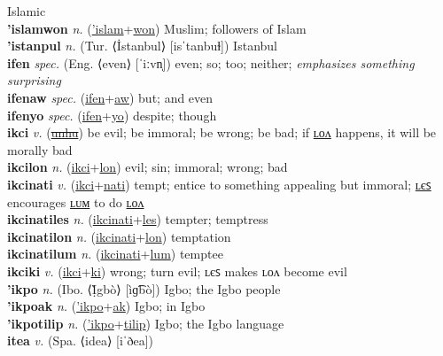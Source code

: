Islamic \label{'islamak} \\
\textbf{'islamwon} \textit{n.} (\hyperref['islam]{'islam}+\hyperref[won]{won})
Muslim; followers of Islam \label{'islamwon} \\
\textbf{'istanpul} \textit{n.} (Tur. ⟨İstanbul⟩ [isˈtanbuɫ])
Istanbul \label{'istanpul} \\
\textbf{ifen} \textit{spec.} (Eng. ⟨even⟩ [ˈiːvn̩])
even; so; too; neither; \textit{emphasizes something surprising} \label{ifen} \\
\textbf{ifenaw} \textit{spec.} (\hyperref[ifen]{ifen}+\hyperref[aw]{aw})
but; and even \label{ifenaw} \\
\textbf{ifenyo} \textit{spec.} (\hyperref[ifen]{ifen}+\hyperref[yo]{yo})
despite; though \label{ifenyo} \\
\textbf{ikci} \textit{v.} (\hyperref[unhu]{\sout{unhu}})
be evil; be immoral; be wrong; be bad; if \hyperref[ikcilon]{ʟᴏᴧ} happens, it will be morally bad \label{ikci} \\
\textbf{ikcilon} \textit{n.} (\hyperref[ikci]{ikci}+\hyperref[lon]{lon})
evil; sin; immoral; wrong; bad \label{ikcilon} \\
\textbf{ikcinati} \textit{v.} (\hyperref[ikci]{ikci}+\hyperref[nati]{nati})
tempt; entice to something appealing but immoral; \hyperref[ikcinatiles]{ʟєꜱ} encourages \hyperref[ikcinatilum]{ʟᴜᴍ} to do \hyperref[ikcinatilon]{ʟᴏᴧ} \label{ikcinati} \\
\textbf{ikcinatiles} \textit{n.} (\hyperref[ikcinati]{ikcinati}+\hyperref[les]{les})
tempter; temptress \label{ikcinatiles} \\
\textbf{ikcinatilon} \textit{n.} (\hyperref[ikcinati]{ikcinati}+\hyperref[lon]{lon})
temptation \label{ikcinatilon} \\
\textbf{ikcinatilum} \textit{n.} (\hyperref[ikcinati]{ikcinati}+\hyperref[lum]{lum})
temptee \label{ikcinatilum} \\
\textbf{ikciki} \textit{v.} (\hyperref[ikci]{ikci}+\hyperref[ki]{ki})
wrong; turn evil; ʟєꜱ makes ʟᴏᴧ become evil \label{ikciki} \\
\textbf{'ikpo} \textit{n.} (Ibo. ⟨Ị̀gbò⟩ [ìɡ͡bò])
Igbo; the Igbo people \label{'ikpo} \\
\textbf{'ikpoak} \textit{n.} (\hyperref['ikpo]{'ikpo}+\hyperref[ak]{ak})
Igbo; in Igbo \label{'ikpoak} \\
\textbf{'ikpotilip} \textit{n.} (\hyperref['ikpo]{'ikpo}+\hyperref[tilip]{tilip})
Igbo; the Igbo language \label{'ikpotilip} \\
\textbf{itea} \textit{v.} (Spa. ⟨idea⟩ [iˈðea])
